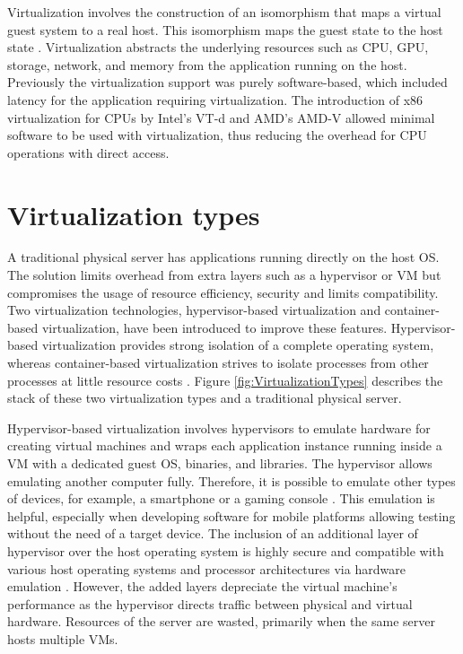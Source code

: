 Virtualization involves the construction of an isomorphism that maps a virtual guest system to a real host. This isomorphism maps the guest state to the host state \cite{Xing2012}. Virtualization abstracts the underlying resources such as CPU, GPU, storage, network, and memory from the application running on the host. Previously the virtualization support was purely software-based, which included latency for the application requiring virtualization. The introduction of x86 virtualization for CPUs by Intel's VT-d and AMD's AMD-V allowed minimal software to be used with virtualization, thus reducing the overhead for CPU operations with direct access.

\section{Virtualization types}

A traditional physical server has applications running directly on the host OS. The solution limits overhead from extra layers such as a hypervisor or VM but compromises the usage of resource efficiency, security and limits compatibility. Two virtualization technologies, hypervisor-based virtualization and container-based virtualization, have been introduced to improve these features. Hypervisor-based virtualization provides strong isolation of a complete operating system, whereas container-based virtualization strives to isolate processes from other processes at little resource costs \cite{Eder2016}. Figure \ref{fig:VirtualizationTypes} describes the stack of these two virtualization types and a traditional physical server.

Hypervisor-based virtualization involves hypervisors to emulate hardware for creating virtual machines and wraps each application instance running inside a VM with a dedicated guest OS, binaries, and libraries. The hypervisor allows emulating another computer fully. Therefore, it is possible to emulate other types of devices, for example, a smartphone or a gaming console \cite{Eder2016}. This emulation is helpful, especially when developing software for mobile platforms allowing testing without the need of a target device. The inclusion of an additional layer of hypervisor over the host operating system is highly secure and compatible with various host operating systems and processor architectures via hardware emulation \cite{Lingayat2018}. However, the added layers depreciate the virtual machine's performance as the hypervisor directs traffic between physical and virtual hardware. Resources of the server are wasted, primarily when the same server hosts multiple VMs.

